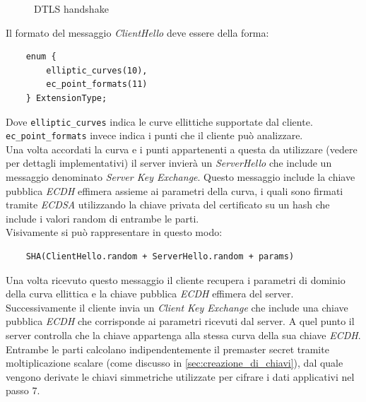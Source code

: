 \documentclass[12pt, a4paper]{report}
\begin{document}
\begin{figure}[H]
    \caption{DTLS handshake}
\end{figure}

Il formato del messaggio \textit{ClientHello} deve essere della forma:
\begin{verbatim}
    enum {
        elliptic_curves(10),
        ec_point_formats(11)
    } ExtensionType;
\end{verbatim}
\cite{rfc8422}

Dove \verb|elliptic_curves| indica le curve ellittiche supportate dal cliente.
\verb|ec_point_formats| invece indica i punti che il cliente può analizzare.
\\Una volta accordati la curva e i punti appartenenti a questa da utilizzare 
(vedere \cite{rfc8422} per dettagli implementativi) il server invierà un \textit{ServerHello}
che include un messaggio denominato \textit{Server Key Exchange}.
Questo messaggio include la chiave pubblica \textit{ECDH} effimera assieme ai parametri della curva,
i quali sono firmati tramite \textit{ECDSA} utilizzando la chiave privata del certificato su un hash
che include i valori random di entrambe le parti.
\\ Visivamente si può rappresentare in questo modo:
\begin{verbatim}
    SHA(ClientHello.random + ServerHello.random + params)
\end{verbatim}
Una volta ricevuto questo messaggio il cliente recupera i parametri di dominio della 
curva ellittica e la chiave pubblica \textit{ECDH} effimera del server.
\\
Successivamente il cliente invia un \textit{Client Key Exchange} che include una 
chiave pubblica \textit{ECDH} che corrisponde ai parametri ricevuti dal server.
A quel punto il server controlla che la chiave appartenga alla stessa curva della sua chiave 
\textit{ECDH}.
\\Entrambe le parti calcolano indipendentemente il premaster secret tramite 
moltiplicazione scalare (come discusso in \hyperref[sec:creazione_di_chiavi]{\ref{sec:creazione_di_chiavi}}), dal quale vengono derivate le 
chiavi simmetriche utilizzate per cifrare i dati applicativi nel passo 7.
\end{document}
